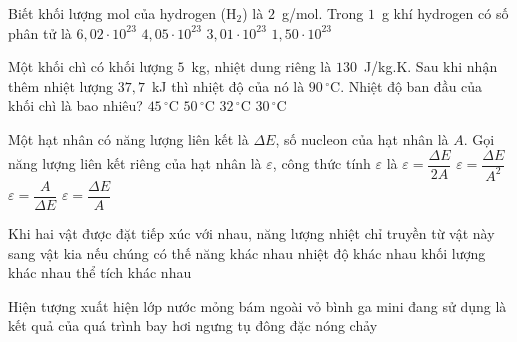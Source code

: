 	\begin{ex}%
		Biết khối lượng mol của hydrogen (H$_2$) là $2$~g/mol. Trong $1$~g khí hydrogen có số phân tử là
		\choice
		{$6{,}02\cdot 10^{23}$}
		{$4{,}05\cdot 10^{23}$}
		{\True $3{,}01\cdot 10^{23}$}
		{$1{,}50\cdot 10^{23}$}
	\end{ex}

	\begin{ex}%
		Một khối chì có khối lượng $5$~kg, nhiệt dung riêng là $130$~J/kg.K. Sau khi nhận thêm nhiệt lượng $37{,}7$~kJ thì nhiệt độ của nó là $90\,^\circ\text{C}$. Nhiệt độ ban đầu của khối chì là bao nhiêu?
		\choice
		{$45\,^\circ\text{C}$}
		{$50\,^\circ\text{C}$}
		{\True $32\,^\circ\text{C}$}
		{$30\,^\circ\text{C}$}
	\end{ex}

	\begin{ex}%
		Một hạt nhân có năng lượng liên kết là $\Delta E$, số nucleon của hạt nhân là $A$. Gọi năng lượng liên kết riêng của hạt nhân là $\varepsilon$, công thức tính $\varepsilon$ là
		\choice
		{$\varepsilon=\dfrac{\Delta E}{2A}$}
		{$\varepsilon=\dfrac{\Delta E}{A^2}$}
		{$\varepsilon=\dfrac{A}{\Delta E}$}
		{\True $\varepsilon=\dfrac{\Delta E}{A}$}
	\end{ex}

	\begin{ex}%
		Khi hai vật được đặt tiếp xúc với nhau, năng lượng nhiệt chỉ truyền từ vật này sang vật kia nếu chúng có
		\choice
		{thế năng khác nhau}
		{\True nhiệt độ khác nhau}
		{khối lượng khác nhau}
		{thể tích khác nhau}
	\end{ex}

	\begin{ex}%
		Hiện tượng xuất hiện lớp nước mỏng bám ngoài vỏ bình ga mini đang sử dụng là kết quả của quá trình
		\choice
		{bay hơi}
		{\True ngưng tụ}
		{đông đặc}
		{nóng chảy}
	\end{ex}

